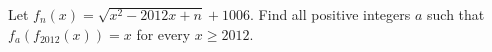 Let $f_n(x)=\sqrt{x^2-2012x+n}+1006$. Find all positive integers $a$ such that $f_a(f_{2012}(x))=x$ for every $x\ge2012$.

